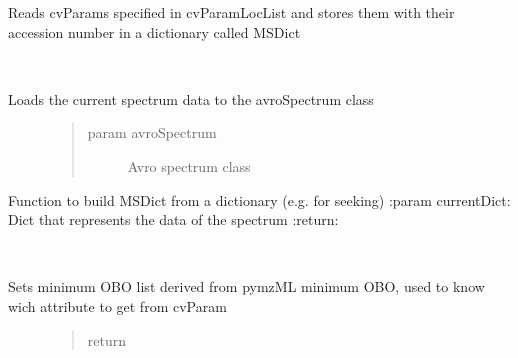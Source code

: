 \documentclass[letterpaper,10pt,english]{sphinxmanual}
\begin{document}
\begin{fulllineitems}
\begin{fulllineitems}
\end{fulllineitems}


\begin{fulllineitems}
\label{avroSpectrum:avroSpectrum.avroSpectrum.iterOvercvParam}
Reads cvParams specified in cvParamLocList and stores them with their accession number in a dictionary called
MSDict

\end{fulllineitems}


\begin{fulllineitems}
\label{avroSpectrum:avroSpectrum.avroSpectrum.setData}~\begin{description}
\item[{Loads the current spectrum data to the avroSpectrum class}] \leavevmode\begin{quote}\begin{description}
\item[{param avroSpectrum}] \leavevmode
Avro spectrum class

\end{description}\end{quote}

\end{description}

\end{fulllineitems}


\begin{fulllineitems}
\label{avroSpectrum:avroSpectrum.avroSpectrum.setFromDict}
Function to build MSDict from a dictionary (e.g. for seeking)
:param currentDict: Dict that represents the data of the spectrum
:return:

\end{fulllineitems}


\begin{fulllineitems}
\label{avroSpectrum:avroSpectrum.avroSpectrum.setMSPropDict}~\begin{description}
\item[{Sets minimum OBO list derived from pymzML minimum OBO, used to know wich attribute to get from cvParam}] \leavevmode\begin{quote}\begin{description}
\item[{return}] \leavevmode
\end{description}\end{quote}


\end{description}
\end{fulllineitems}
\end{fulllineitems}
\end{document}
